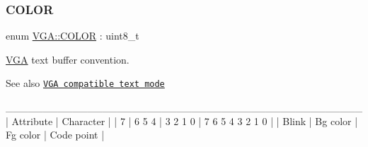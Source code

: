 \subsubsection{\texorpdfstring{C\+O\+L\+OR}{COLOR}}
{\footnotesize\ttfamily enum \hyperlink{namespace_v_g_a_ace1c3156a8d3975ff783ff7a1fa8eb71}{V\+G\+A\+::\+C\+O\+L\+OR} \+: uint8\+\_\+t\hspace{0.3cm}{\ttfamily [strong]}}



\hyperlink{namespace_v_g_a}{V\+GA} text buffer convention. 

\begin{DoxySeeAlso}{See also}
\href{https://en.wikipedia.org/wiki/VGA-compatible_text_mode}{\tt V\+GA compatible text mode} \begin{DoxyVerb}________________________________________________
|         Attribute           |    Character    |
|   7   |   6 5 4  | 3 2 1 0  | 7 6 5 4 3 2 1 0 |
| Blink | Bg color | Fg color | Code point      |
\end{DoxyVerb}
 
\end{DoxySeeAlso}
